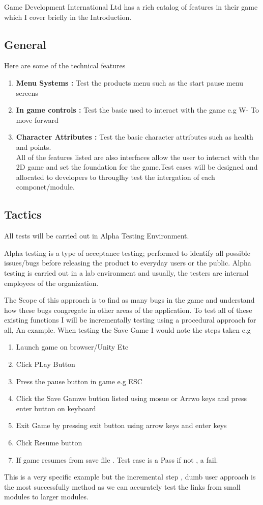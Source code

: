 Game Development International Ltd has a rich catalog of features in their game which I cover briefly in
the Introduction.
\subsection{General}
Here are some of the technical features
\begin{enumerate}
  \item    \textbf{Menu Systems :}  Test the products menu such as the start  pause menu screens
  \item    \textbf{In game controls :} Test the basic used to interact with the game e.g W- To move forward
  \item     \textbf{Character Attributes :} Test the basic character attributes such as health and points.\\


  All of the features listed are also interfaces allow the user to interact with the 2D game and set the foundation for the game.Test cases will be designed and allocated to developers to througlhy test the intergation of each componet/module.
\end{enumerate}


\subsection{Tactics}


All tests will be carried out in Alpha Testing Environment.


Alpha testing is a type of acceptance testing; performed to identify all possible issues/bugs before releasing the product to everyday users or the public. Alpha testing is carried out in a lab environment and usually, the testers are internal employees of the organization.


The Scope of this approach is to find as many
bugs in the game and understand how these bugs congregate in other areas of the application.
To test all of these existing functions I will be incrementally testing using a procedural approach for all, An example. When testing the Save Game
I would note the steps taken e.g 

\begin{enumerate}
	\item  Launch game on browser/Unity Etc
	\item  Click PLay Button
	\item Press the pause button in game e.g ESC
	\item  Click the Save Gamwe button listed using mosue or Arrwo keys and press enter button on keyboard
	\item Exit Game by pressing exit button using arrow keys and enter keys 
	\item Click Resume button
	\item If game resumes from save file . Test case is a Pass if not , a fail.

\end{enumerate}

This is a very specific example but the incremental step , dumb user approach is the most successfully method as we can accurately test the links from small modules to larger modules.